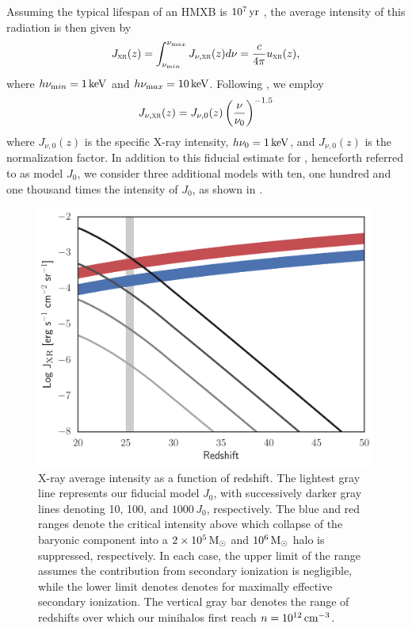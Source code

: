 \documentclass[../thesis.tex]{subfiles}
\begin{document}
Assuming the typical lifespan of an HMXB is $10^7\,\mathrm{yr}$ \citep[e.g.,][]{BelczynskiBulikFryer2012, Jeonetal2012}, the average
intensity of this radiation \jxrz is then given by 
\begin{equation} 
  J_{\textsc{xr}}(z) =  \int_{\nu_{\mathrm min}}^{\nu_{\mathrm max}} J_{\nu, \textsc{xr}}(z) d\nu = \frac{c}{4\pi} {u}_{\textsc{xr}}(z),
\end{equation}
where $h\nu_{\mathrm min} = 1\,\mathrm{keV}$ and $h\nu_{\mathrm max} = 10\,\mathrm{keV}$.
Following \citet{InayoshiOmukai2011}, we employ
\begin{equation}
  \label{JXRnu}
  J_{\nu, \textsc{xr}}(z) = J_{\nu,0}(z) \left(\frac{\nu}{\nu_0}\right)^{-1.5} 
\end{equation}
where $J_{\nu,0}(z)$ is the specific X-ray intensity, $h\nu_0 = 1\,\mathrm{keV}$, and $J_{\nu, 0}(z)$ is the normalization factor.
In addition to this fiducial estimate for \jxrz, henceforth referred to as model $J_0$, we consider three
additional models with ten, one hundred and one thousand times the
intensity of $J_0$, as shown in . 

\begin{figure}
 \begin{center}
   \includegraphics[width=\columnwidth]{figures/J_xr}
   \caption{X-ray average intensity as a function of redshift. The
     lightest gray line represents our fiducial model $J_0$, with successively darker gray lines denoting 10, 100, and $1000\,J_0$, respectively. The blue and red ranges denote the critical intensity above which collapse of the baryonic component into a $2\times10^5\,\mathrm{M}_{\odot}$ and $10^6\,\mathrm{M}_{\odot}$ halo is suppressed, respectively. In each case, the upper limit of the range assumes the contribution from secondary ionization is negligible, while the lower limit denotes denotes \jcrit for maximally effective secondary ionization. The vertical gray bar denotes the range of redshifts over which our minihalos first reach $n=10^{12}\,\mathrm{cm}^{-3}$.}
   \label{xrayIntensity}
 \end{center}
\end{figure}
\end{document}
